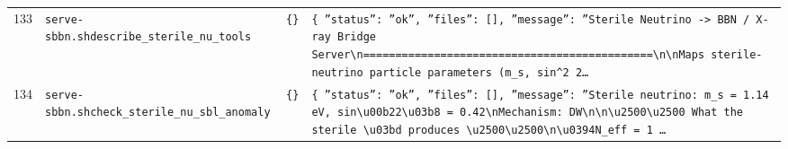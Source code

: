 \documentclass[11pt,a4paper]{article}
\begin{document}
\begin{longtable}{@{}p{}p{}p{}p{}@{}}
133 & \texttt{serve-sbbn.sh}\newline\texttt{describe\_\allowbreak{}sterile\_\allowbreak{}nu\_\allowbreak{}tools} & \texttt{\{\}\allowbreak{}} & \texttt{\{   ''status'':\allowbreak{} ''ok'',\allowbreak{}   ''files'':\allowbreak{} []\allowbreak{},\allowbreak{}   ''message'':\allowbreak{} ''Sterile Neutrino -\textgreater{}\allowbreak{} BBN /\allowbreak{} X-ray Bridge Server\textbackslash{}\allowbreak{}n=\allowbreak{}=\allowbreak{}=\allowbreak{}=\allowbreak{}=\allowbreak{}=\allowbreak{}=\allowbreak{}=\allowbreak{}=\allowbreak{}=\allowbreak{}=\allowbreak{}=\allowbreak{}=\allowbreak{}=\allowbreak{}=\allowbreak{}=\allowbreak{}=\allowbreak{}=\allowbreak{}=\allowbreak{}=\allowbreak{}=\allowbreak{}=\allowbreak{}=\allowbreak{}=\allowbreak{}=\allowbreak{}=\allowbreak{}=\allowbreak{}=\allowbreak{}=\allowbreak{}=\allowbreak{}=\allowbreak{}=\allowbreak{}=\allowbreak{}=\allowbreak{}=\allowbreak{}=\allowbreak{}=\allowbreak{}=\allowbreak{}=\allowbreak{}=\allowbreak{}=\allowbreak{}=\allowbreak{}=\allowbreak{}=\allowbreak{}=\allowbreak{}\textbackslash{}\allowbreak{}n\textbackslash{}\allowbreak{}nMaps sterile-neutrino particle parameters (m\_\allowbreak{}s,\allowbreak{} sin\textasciicircum{}\allowbreak{}2 2\ldots{}\allowbreak{}} \\
134 & \texttt{serve-sbbn.sh}\newline\texttt{check\_\allowbreak{}sterile\_\allowbreak{}nu\_\allowbreak{}sbl\_\allowbreak{}anomaly} & \texttt{\{\}\allowbreak{}} & \texttt{\{   ''status'':\allowbreak{} ''ok'',\allowbreak{}   ''files'':\allowbreak{} []\allowbreak{},\allowbreak{}   ''message'':\allowbreak{} ''Sterile neutrino:\allowbreak{} m\_\allowbreak{}s =\allowbreak{} 1.14 eV,\allowbreak{} sin\textbackslash{}\allowbreak{}u00b22\textbackslash{}\allowbreak{}u03b8 =\allowbreak{} 0.42\textbackslash{}\allowbreak{}nMechanism:\allowbreak{} DW\textbackslash{}\allowbreak{}n\textbackslash{}\allowbreak{}n\textbackslash{}\allowbreak{}u2500\textbackslash{}\allowbreak{}u2500 What the sterile \textbackslash{}\allowbreak{}u03bd produces \textbackslash{}\allowbreak{}u2500\textbackslash{}\allowbreak{}u2500\textbackslash{}\allowbreak{}n\textbackslash{}\allowbreak{}u0394N\_\allowbreak{}eff =\allowbreak{} 1 \ldots{}\allowbreak{}} \\

\end{longtable}
\end{document}
